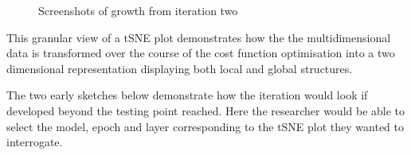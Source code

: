\documentclass[a4paper,11pt,titlepage]{article}
\begin{document}
	\begin{figure}[H]
    			\centering	
    			\qquad
    			 \qquad
    			\caption{Screenshots of growth from iteration two}%
    			\label{fig:iter2}
	\end{figure}	
	 
	\par 
	This granular view of a tSNE plot demonstrates how the the multidimensional data is transformed over the course of the cost function optimisation into a two dimensional representation displaying both local and global structures.
	\par 
	The two early sketches below demonstrate how the iteration would look if developed beyond the testing point reached. Here the researcher would be able to select the model, epoch and layer corresponding to the tSNE plot they wanted to interrogate. 

	\begin{figure}[H]
    			\centering	
    			\qquad
    			\caption{ }%
    			\label{fig:iter2}
	\end{figure}		
		
\end{document}
